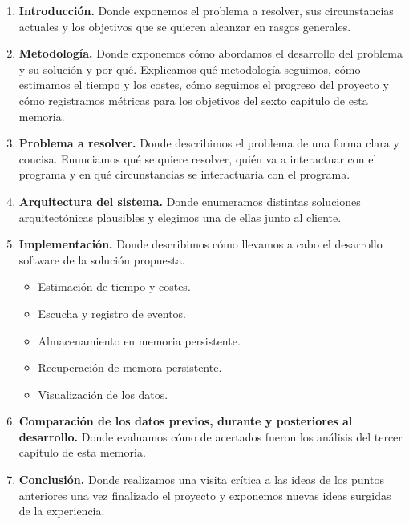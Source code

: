 \begin{enumerate}
    \item \textbf{Introducción.} Donde exponemos el problema a resolver,
    sus circunstancias actuales y los objetivos que se quieren alcanzar en rasgos generales.

    \item \textbf{Metodología.} Donde exponemos cómo abordamos el desarrollo del problema y su solución y por qué.
    Explicamos qué metodología seguimos, cómo estimamos el tiempo y los costes, cómo seguimos el progreso
    del proyecto y cómo registramos métricas para los objetivos del sexto capítulo de esta memoria.

    \item \textbf{Problema a resolver.} Donde describimos el problema de una forma clara y concisa.
    Enunciamos qué se quiere resolver, quién va a interactuar con el programa y en qué circunstancias
    se interactuaría con el programa.

    \item \textbf{Arquitectura del sistema.} Donde enumeramos distintas soluciones arquitectónicas
    plausibles y elegimos una de ellas junto al cliente.

    \item \textbf{Implementación.} Donde describimos cómo llevamos a cabo el desarrollo software
    de la solución propuesta.
    \begin{itemize}[noitemsep,nolistsep]
        \item Estimación de tiempo y costes.
        \item Escucha y registro de eventos.
        \item Almacenamiento en memoria persistente.
        \item Recuperación de memora persistente.
        \item Visualización de los datos.
    \end{itemize}

    \item \textbf{Comparación de los datos previos, durante y posteriores al desarrollo.} Donde evaluamos cómo de
    acertados fueron los análisis del tercer capítulo de esta memoria.

    \item \textbf{Conclusión.} Donde realizamos una visita crítica a las ideas de los puntos
    anteriores una vez finalizado el proyecto y exponemos nuevas ideas surgidas de la experiencia.
\end{enumerate}
